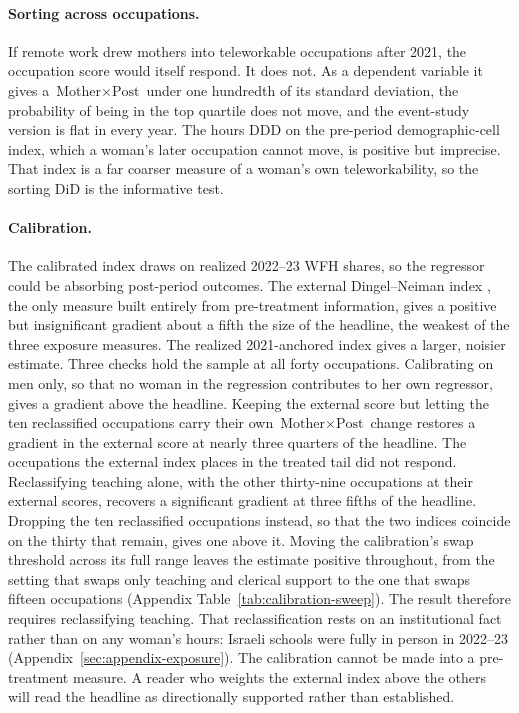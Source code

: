 \documentclass[12pt,a4paper]{article}
\newcommand{\Mother}{\text{Mother}}
\newcommand{\Post}{\text{Post}}
\begin{document}
\paragraph{Sorting across occupations.}
If remote work drew mothers into teleworkable occupations after 2021, the occupation score would
itself respond. It does not. As a dependent variable it gives a $\Mother \times \Post$ under one
hundredth of its standard deviation, the probability of being in the top quartile does not move,
and the event-study version is flat in every year. The hours DDD on the pre-period
demographic-cell index, which a woman's later occupation cannot move, is positive but imprecise.
That index is a far coarser measure of a woman's own teleworkability, so the sorting DiD is the
informative test.

\paragraph{Calibration.}
The calibrated index draws on realized 2022--23 WFH shares, so the regressor could be absorbing
post-period outcomes. The external Dingel--Neiman index \citep{dingel2020}, the only measure
built entirely from pre-treatment information, gives a positive but insignificant gradient about
a fifth the size of the headline, the weakest of the three exposure measures. The realized
2021-anchored index gives a larger, noisier estimate. Three checks hold the sample at all forty
occupations. Calibrating on men only, so that no woman in the regression contributes to her own
regressor, gives a gradient above the headline. Keeping the external score but letting the ten
reclassified occupations carry their own $\Mother \times \Post$ change restores a gradient in the
external score at nearly three quarters of the headline. The occupations the external index
places in the treated tail did not respond. Reclassifying teaching alone, with the other
thirty-nine occupations at their external scores, recovers a significant gradient at three fifths
of the headline. Dropping the ten reclassified occupations instead, so that the two indices
coincide on the thirty that remain, gives one above it. Moving the calibration's swap threshold
across its full range leaves the estimate positive throughout, from the setting that swaps only
teaching and clerical support to the one that swaps fifteen occupations (Appendix
Table~\ref{tab:calibration-sweep}). The result therefore requires reclassifying teaching. That
reclassification rests on an institutional fact rather than on any woman's hours: Israeli schools
were fully in person in 2022--23 (Appendix~\ref{sec:appendix-exposure}). The calibration cannot
be made into a pre-treatment measure. A reader who weights the external index above the others
will read the headline as directionally supported rather than established.
\end{document}
